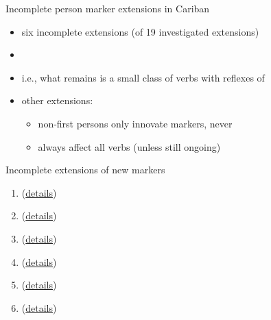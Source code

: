 \documentclass[9pt]{beamer}
\begin{document}
\begin{frame}{Incomplete person marker extensions in Cariban}
\begin{itemize}
	\item six incomplete extensions (of 19 investigated extensions)
	\item {}
	\item i.e., what remains is a small class of verbs with reflexes of \PC {} 
	\item other extensions: \begin{itemize}
	\item non-first persons only innovate  markers, never 
	\item always affect all verbs (unless still ongoing)\end{itemize}
\end{itemize}
\end{frame}

\begin{frame}{Incomplete extensions of new  markers}
\begin{enumerate}
	\item \PPek {} (\hyperlink{sec:ppek}{details})
	\item \PWai {} (\hyperlink{sec:pwai}{details})
	\item \PTir {} (\hyperlink{sec:ptir}{details})
	\item \akuriyo {} (\hyperlink{sec:aku}{details})
	\item \carijo {} (\hyperlink{sec:car}{details})
	\item \yukpa {} (\hyperlink{sec:yuk}{details})
\end{enumerate}
\end{frame}
\end{document}
